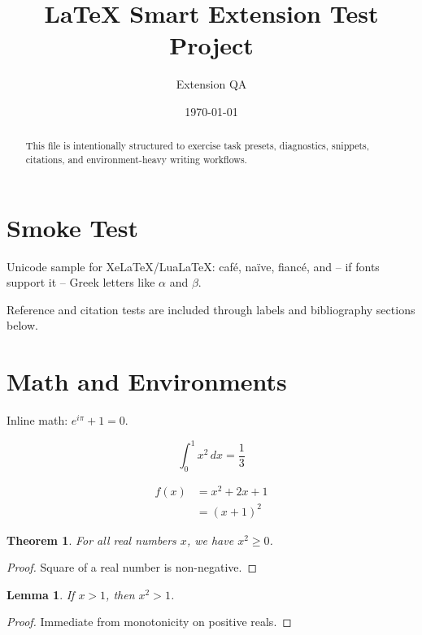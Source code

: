 \documentclass[11pt]{article}
\title{LaTeX Smart Extension Test Project}
\author{Extension QA}
\date{\today}
\newtheorem{theorem}{Theorem}
\newtheorem{lemma}{Lemma}
\begin{document}
\maketitle

\begin{abstract}
This file is intentionally structured to exercise task presets, diagnostics, snippets,
citations, and environment-heavy writing workflows.
\end{abstract}

\tableofcontents

\section{Smoke Test}\label{sec:smoke}
Unicode sample for XeLaTeX/LuaLaTeX: caf\'e, na\"ive, fianc\'e, and -- if fonts support it --
Greek letters like $\alpha$ and $\beta$.

Reference and citation tests are included through labels and bibliography sections below.



\section{Math and Environments}\label{sec:math}

Inline math: $e^{i\pi}+1=0$.

\begin{equation}
\int_0^1 x^2\,dx = \frac{1}{3}
\end{equation}

\begin{align}
f(x) &= x^2 + 2x + 1 \\
     &= (x+1)^2
\end{align}

\begin{theorem}
For all real numbers $x$, we have $x^2 \ge 0$.
\end{theorem}

\begin{proof}
Square of a real number is non-negative.
\end{proof}

\begin{lemma}
If $x > 1$, then $x^2 > 1$.
\end{lemma}

\begin{proof}
Immediate from monotonicity on positive reals.
\end{proof}
\end{document}
